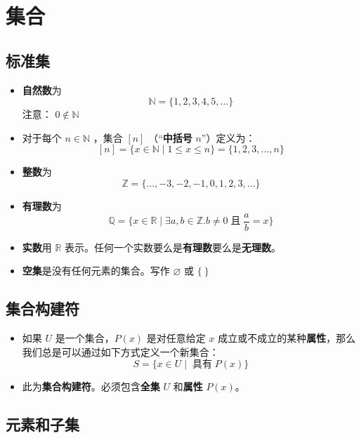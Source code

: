\section{集合}

\subsection{标准集}

\begin{itemize}
    \item \textbf{自然数}为
        \[\mathbb{N} = \{1,2,3,4,5,\dots\}\]
        注意： $0 \notin \mathbb{N}$
    \item 对于每个 $n \in \mathbb{N}$ ，集合 $[n]$ （``\textbf{中括号} $n$''）定义为：
        \[[n] = \{x \in \mathbb{N} \mid 1 \le x \le n\} = \{1,2,3,\dots,n\}\]
    \item \textbf{整数}为
        \[\mathbb{Z} = \{\dots,-3,-2,-1,0,1,2,3,\dots\}\]
    \item \textbf{有理数}为
        \[\mathbb{Q} = \{x \in \mathbb{R} \mid \exists a,b \in \mathbb{Z}. b \ne 0 \;\text{且}\; \frac{a}{b}=x\}\]
    \item \textbf{实数}用 $\mathbb{R}$ 表示。任何一个实数要么是\textbf{有理数}要么是\textbf{无理数}。
    \item \textbf{空集}是没有任何元素的集合。写作 $\varnothing$ 或 $\{\:\}$
\end{itemize}


\subsection{集合构建符}

\begin{itemize}
    \item 如果 $U$ 是一个集合，$P(x)$ 是对任意给定 $x$ 成立或不成立的某种\textbf{属性}，那么我们总是可以通过如下方式定义一个新集合：
        \[S = \{x \in U \mid \;\text{具有}\; P(x)\}\]
    \item 此为\textbf{集合构建符}。必须包含\textbf{全集} $U$ 和\textbf{属性} $P(x)$。
\end{itemize}

\subsection{元素和子集}

